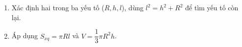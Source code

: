 \begin{enumerate}
\item Xác định hai trong ba yếu tố ($R, h, l$), dùng $l^2 = h^2 + R^2$ để tìm yếu tố còn lại.
\item Áp dụng $S_{xq} = \pi R l$ và $V = \dfrac{1}{3}\pi R^2 h$.
\end{enumerate}
